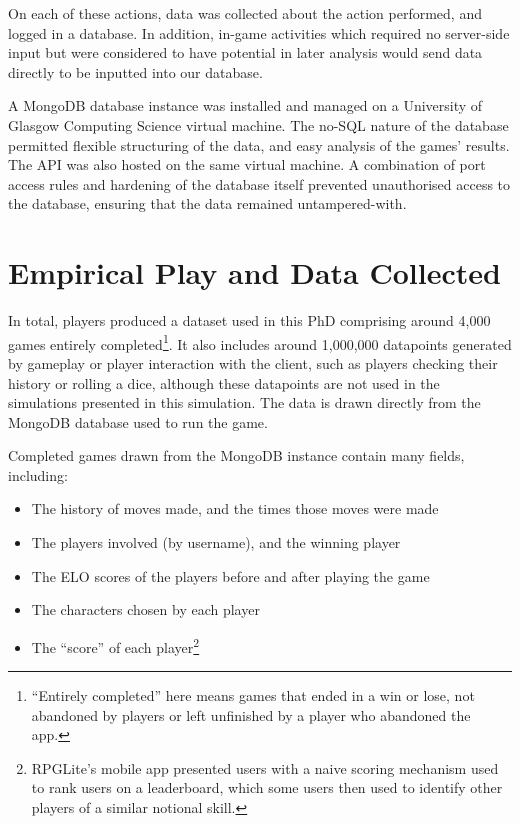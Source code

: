 On each of these actions, data was collected about the action performed, and
logged in a database. In addition, in-game activities which required no
server-side input but were considered to have potential in later analysis would
send data directly to be inputted into our database.

A MongoDB database instance was installed and managed on a University of Glasgow
Computing Science virtual machine. The no-SQL nature of the database permitted
flexible structuring of the data, and easy analysis of the games' results. The
API was also hosted on the same virtual machine. A combination of port access
rules and hardening of the database itself prevented unauthorised access to the
database, ensuring that the data remained untampered-with.



\section{Empirical Play and Data Collected}

In total, players produced a dataset used in this PhD comprising around 4,000
games entirely
completed\footnote{``Entirely completed'' here means games that ended in a win
or lose, not abandoned by players or left unfinished by a player who abandoned
the app.}. It also includes around 1,000,000 datapoints generated by gameplay or
player interaction with the client, such as players checking their history or
rolling a dice, although these datapoints are not used in the simulations
presented in this simulation. The data is drawn directly from the MongoDB
database used to run the game.

Completed games drawn from the MongoDB instance contain many fields, including: 

\begin{itemize} \item The history of moves made, and the times those moves were
made  \item The
players involved (by username), and the winning player \item The ELO scores of
the players before and after playing the game  \item The characters chosen by
each player \item The ``score'' of each player\footnote{RPGLite's mobile app
presented users with a naive scoring mechanism used to rank users on a
leaderboard, which some users then used to identify other players of a similar
notional skill.} \end{itemize}



